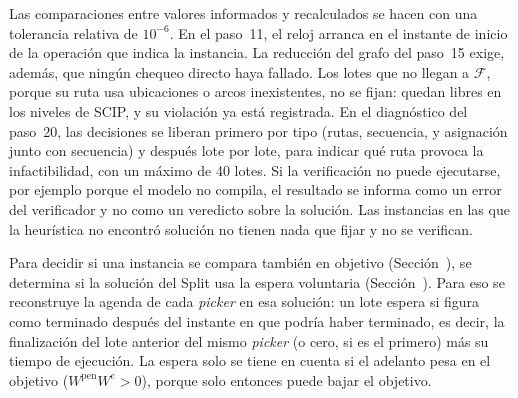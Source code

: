Las comparaciones entre valores informados y recalculados se hacen con una
tolerancia relativa de $10^{-6}$. En el paso~11, el reloj arranca en el
instante de inicio de la operación que indica la instancia. La reducción del grafo del paso~15 exige, además, que ningún chequeo
directo haya fallado. Los lotes que no llegan a $\mathcal{F}$,
porque su ruta usa ubicaciones o arcos inexistentes, no se fijan: quedan
libres en los niveles de SCIP, y su violación ya está registrada. En el
diagnóstico del paso~20, las decisiones se liberan primero por tipo (rutas,
secuencia, y asignación junto con secuencia) y después lote por lote, para
indicar qué ruta provoca la infactibilidad, con un máximo de 40 lotes. Si la verificación no puede
ejecutarse, por ejemplo porque el modelo no compila, el resultado se informa
como un error del verificador y no como un veredicto sobre la solución. Las
instancias en las que la heurística no encontró solución no tienen nada que
fijar y no se verifican.

\stopsection

\startsection[title={Detección de la espera voluntaria}, reference=sec:anexo_espera]

Para decidir si una instancia se compara también en objetivo
(Sección~), se determina si la solución del Split usa
la espera voluntaria (Sección~). Para eso se
reconstruye la agenda de cada {\em picker} en esa solución: un lote espera si
figura como terminado después del instante en que podría haber terminado, es
decir, la finalización del lote anterior del mismo {\em picker} (o cero, si
es el primero) más su tiempo de ejecución. La espera solo se tiene en cuenta
si el adelanto pesa en el objetivo ($W^{\text{pen}} W^{e} > 0$), porque solo
entonces puede bajar el objetivo.

\stopsection
\stopchapter
